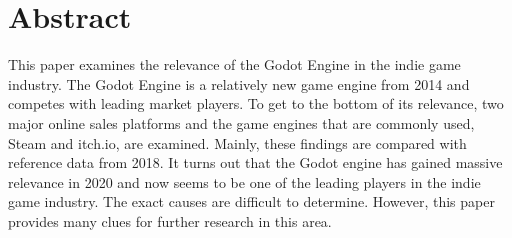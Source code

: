 \section*{Abstract}
This paper examines the relevance of the Godot Engine in the indie game industry.
The Godot Engine is a relatively new game engine from 2014 and competes with leading market players.
To get to the bottom of its relevance, two major online sales platforms and the game engines that are commonly used, Steam and itch.io, are examined.
Mainly, these findings are compared with reference data from 2018.
It turns out that the Godot engine has gained massive relevance in 2020 and now seems to be one of the leading players in the indie game industry.
The exact causes are difficult to determine.
However, this paper provides many clues for further research in this area.
